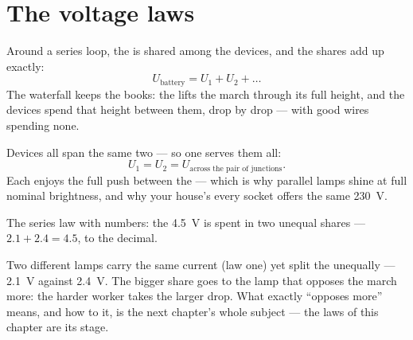 \section{The voltage laws}

\begin{proposition}\label{prop:g8:circuit-laws:seriesU}
Around a series loop, the   is shared among the
devices, and the shares add up exactly:
\[
U_{\text{battery}} = U_1 + U_2 + \dots
\]
The waterfall  keeps the books: the  lifts the
march through its full height, and the devices spend that
height between them, drop by drop --- with good wires spending
none.
\end{proposition}

\begin{proposition}\label{prop:g8:circuit-laws:parallelU}
Devices  all span the same two  --- so one
 serves them all:
\[
U_1 = U_2 = U_{\text{across the pair of junctions}} .
\]
Each  enjoys the full push between the  ---
which is why parallel lamps shine at full nominal brightness,
and why your house's every socket offers the same
\qty{230}{V}.
\end{proposition}

\begin{omfigure}

{\small The series  law with numbers: the 
\qty{4.5}{V} is spent in two unequal shares --- $2.1 + 2.4 =
4.5$, to the decimal.}
\end{omfigure}

\begin{example}\label{ex:g8:circuit-laws:unequal}
Two different lamps  carry the same current (law one)
yet split the  unequally --- \qty{2.1}{V} against
\qty{2.4}{V}. The bigger share goes to the lamp that opposes
the march more: the harder worker takes the larger drop. What
exactly ``opposes more'' means, and how to  it, is the
next chapter's whole subject --- the laws of this chapter are
its stage.
\end{example}

